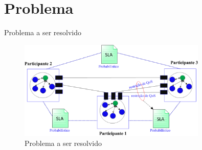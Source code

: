\documentclass[xcolor=svgnames]{beamer}
\begin{document}
\section{Problema}

    \begin{frame}{Problema a ser resolvido}
      \begin{figure}[!h]
	  \centering
	  \includegraphics[width=0.8\textwidth]{ChoreographySLAs.png}
	  \caption{Problema a ser resolvido}
      \end{figure}	
    \end{frame}
\end{document}
